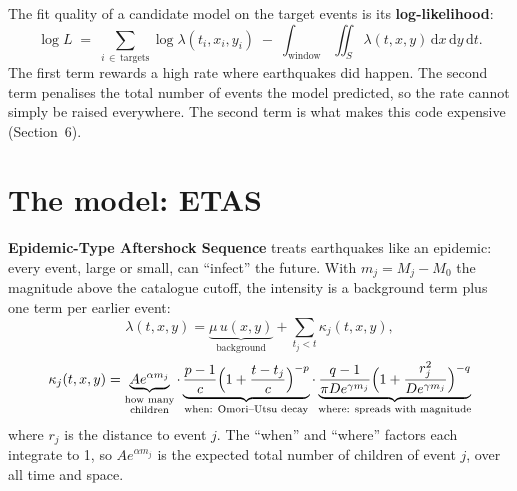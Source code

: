 \documentclass[11pt,a4paper]{article}
\newcommand{\dd}{\,\mathrm{d}}
\begin{document}
The fit quality of a candidate model on the target events is its \textbf{log-likelihood}:
\begin{equation}
  \log L \;=\; \sum_{i\,\in\,\text{targets}} \log \lambda(t_i,x_i,y_i)
  \;-\; \int_{\text{window}}\!\!\iint_{S} \lambda(t,x,y) \dd x\dd y\dd t .
  \label{eq:logL}
\end{equation}
The first term rewards a high rate where earthquakes did happen. The second term penalises the
total number of events the model predicted, so the rate cannot simply be raised everywhere. The
second term is what makes this code expensive (Section~6).

\section{The model: ETAS}

\textbf{Epidemic-Type Aftershock Sequence} treats earthquakes like an epidemic: every event, large
or small, can ``infect'' the future. With $m_j = M_j - M_0$ the magnitude above the catalogue
cutoff, the intensity is a background term plus one term per earlier event:
\begin{equation}
  \lambda(t,x,y) = \underbrace{\mu\,u(x,y)}_{\text{background}}
  + \sum_{t_j<t} \kappa_j(t,x,y),
  \label{eq:lambda}
\end{equation}
\begin{equation}
  \kappa_j(t,x,y) =
  \underbrace{A e^{\alpha m_j}}_{\substack{\text{how many}\\\text{children}}}
  \cdot
  \underbrace{\frac{p-1}{c}\Bigl(1+\frac{t-t_j}{c}\Bigr)^{-p}}_{\substack{\text{when: Omori--Utsu decay}}}
  \cdot
  \underbrace{\frac{q-1}{\pi D e^{\gamma m_j}}\Bigl(1+\frac{r_j^2}{D e^{\gamma m_j}}\Bigr)^{-q}}_{\substack{\text{where: spreads with magnitude}}}
  \label{eq:kappa}
\end{equation}
where $r_j$ is the distance to event $j$. The ``when'' and ``where'' factors each integrate to 1,
so $A e^{\alpha m_j}$ is the expected total number of children of event $j$, over all time and space.
\end{document}
